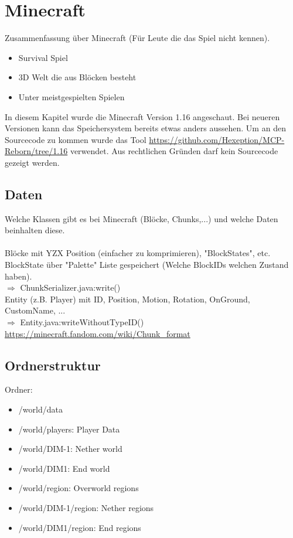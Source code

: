\section{Minecraft}
Zusammenfassung über Minecraft (Für Leute die das Spiel nicht kennen).
\begin{itemize}
    \item Survival Spiel
    \item 3D Welt die aus Blöcken besteht
    \item Unter meistgespielten Spielen
\end{itemize}

In diesem Kapitel wurde die Minecraft Version 1.16 angeschaut. 
Bei neueren Versionen kann das Speichersystem bereits etwas anders aussehen. Um an den Sourcecode zu kommen wurde das Tool 
\url{https://github.com/Hexeption/MCP-Reborn/tree/1.16} verwendet. Aus rechtlichen Gründen darf kein
Sourcecode gezeigt werden.

\subsection{Daten}
Welche Klassen gibt es bei Minecraft (Blöcke, Chunks,...) und welche Daten 
beinhalten diese.\\
\\
Blöcke mit YZX Position (einfacher zu komprimieren), "BlockStates", etc.\\
BlockState über "Palette" Liste gespeichert (Welche BlockIDs welchen Zustand haben).\\
$\Rightarrow{}$ ChunkSerializer.java:write()\\

Entity (z.B. Player) mit ID, Position, Motion, Rotation, OnGround, CustomName, ...\\
$\Rightarrow{}$ Entity.java:writeWithoutTypeID()\\

\url{https://minecraft.fandom.com/wiki/Chunk_format}

\subsection{Ordnerstruktur}
Ordner:
\begin{itemize}
    \item /world/data
    \item /world/players: Player Data
    \item /world/DIM-1: Nether world
    \item /world/DIM1: End world
    \item /world/region: Overworld regions
    \item /world/DIM-1/region: Nether regions
    \item /world/DIM1/region: End regions
\end{itemize}

